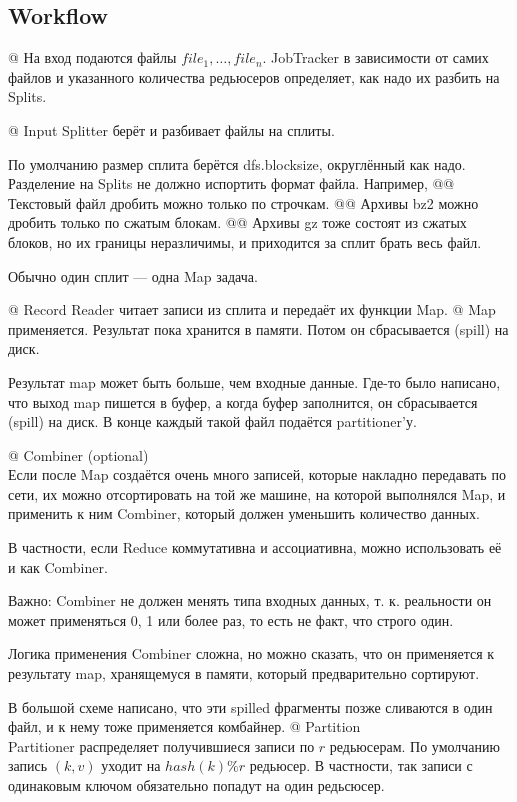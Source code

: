 \subsection{Workflow}
\begin{el}[ul]
@ 
На вход подаются файлы $file_1, \dots, file_n$. JobTracker в зависимости от самих файлов и указанного количества редьюсеров определяет, как надо их разбить на Splits. 

@ Input Splitter берёт и разбивает файлы на сплиты.

По умолчанию размер сплита берётся dfs.blocksize, округлённый как надо. Разделение на Splits не должно испортить формат файла.
Например, 
@@ Текстовый файл дробить можно только по строчкам.
@@ Архивы bz2 можно дробить только по сжатым блокам.
@@ Архивы gz тоже состоят из сжатых блоков, но их границы неразличимы, и приходится за сплит брать весь файл.

Обычно один сплит --- одна Map задача.

@ Record Reader читает записи из сплита и передаёт их функции Map.
@ Map применяется. Результат пока хранится в памяти. Потом он сбрасывается (spill) на диск.

Результат map может быть больше, чем входные данные. Где-то было написано, что выход map пишется в буфер, а когда буфер заполнится, он сбрасывается (spill) на диск. В конце каждый такой файл подаётся partitioner'у.

@ Combiner (optional)\\
Если после Map создаётся очень много записей, которые накладно передавать по сети, их можно отсортировать на той же машине, на которой выполнялся Map, и применить к ним Combiner, который должен уменьшить количество данных.

В частности, если Reduce коммутативна и ассоциативна, можно использовать её и как Combiner.

Важно: Combiner не должен менять типа входных данных, т. к. реальности он может применяться 0, 1 или более раз, то есть не факт, что строго один.

Логика применения Combiner сложна, но можно сказать, что он применяется к результату map, хранящемуся в памяти, который предварительно сортируют. 

В большой схеме написано, что эти spilled фрагменты позже сливаются в один файл, и к нему тоже применяется комбайнер.
@ Partition\\
Partitioner распределяет получившиеся записи по $r$ редьюсерам. По умолчанию запись $(k, v)$ уходит на $hash(k) \% r$ редьюсер. В частности, так записи с одинаковым ключом обязательно попадут на один редьсюсер.


\end{el}

